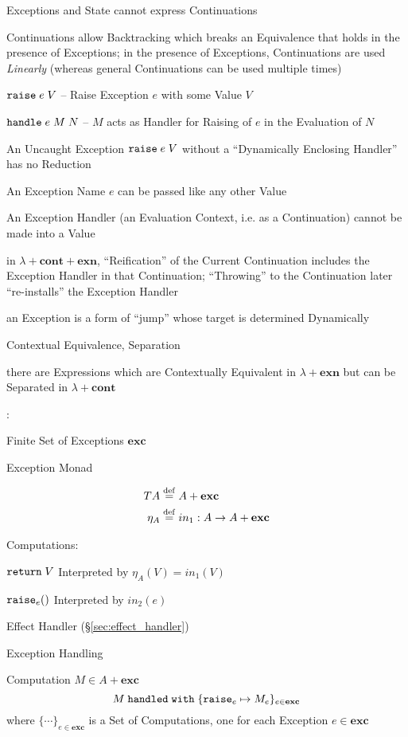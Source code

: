Exceptions and State cannot express Continuations

Continuations allow Backtracking which breaks an Equivalence that
holds in the presence of Exceptions; in the presence of Exceptions,
Continuations are used \emph{Linearly} (whereas general Continuations
can be used multiple times)

$\mathtt{raise}\;e\;V$ -- Raise Exception $e$ with some Value $V$

$\mathtt{handle}\;e\;M\;N$ -- $M$ acts as Handler for Raising of $e$ in
the Evaluation of $N$

An Uncaught Exception $\mathtt{raise}\;e\;V$ without a ``Dynamically
Enclosing Handler'' has no Reduction

An Exception Name $e$ can be passed like any other Value

An Exception Handler (an Evaluation Context, i.e. as a Continuation)
cannot be made into a Value

in $\lambda + \mathbf{cont} + \mathbf{exn}$, ``Reification'' of the
Current Continuation includes the Exception Handler in that
Continuation; ``Throwing'' to the Continuation later ``re-installs''
the Exception Handler

an Exception is a form of ``jump'' whose target is determined
Dynamically %

Contextual Equivalence, Separation %

there are Expressions which are Contextually Equivalent in $\lambda +
\mathbf{exn}$ but can be Separated in $\lambda + \mathbf{cont}$


\cite{plotkin-pretnar13}:

Finite Set of Exceptions $\mathbf{exc}$

Exception Monad

\begin{align*}
     T A & \stackrel{\mathrm{def}}= A + \mathbf{exc} \\
  \eta_A & \stackrel{\mathrm{def}}= in_1 : A \rightarrow A + \mathbf{exc}
\end{align*}

Computations:

$\mathtt{return}\; V$ Interpreted by $\eta_A(V) = in_1(V)$

$\mathtt{raise}_e()$ Interpreted by $in_2(e)$

Effect Handler (\S\ref{sec:effect_handler})

Exception Handling

Computation $M \in A + \mathbf{exc}$
\[
  M \;\mathtt{handled\;with}\;
    \{\mathtt{raise}_e \mapsto M_e \}_{e\in\mathbf{exc}}
\]
where $\{\cdots\}_{e\in\mathbf{exc}}$ is a Set of Computations, one
for each Exception $e \in \mathbf{exc}$

